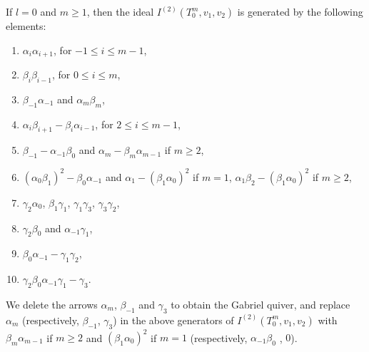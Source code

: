 \documentclass[12pt]{amsart}
\numberwithin{equation}{thm}
\begin{document}
If $l=0$ and $m\ge1$, then the ideal $I^{(2)}(T_{0}^{m},v_{1},v_{2})$ is generated by the following elements:
\begin{enumerate}
\item $\alpha_{i}\alpha_{i+1}$, for $-1\leq i\leq m-1$,
\item $\beta_{i}\beta_{i-1}$, for $0\leq i\leq m$,  
\item $\beta_{-1}\alpha_{-1}$ and $\alpha_m\beta_m$,
\item $\alpha_{i}\beta_{i+1}-\beta_{i}\alpha_{i-1}$, for $2\leq i\leq m-1$, 
\item $\beta_{-1}-\alpha_{-1}\beta_{0}$ and $\alpha_{m}-\beta_{m}\alpha_{m-1}$ if $m\ge2$,
\item $(\alpha_{0}\beta_{1})^{2}-\beta_{0}\alpha_{-1}$ and 
$\alpha_{1}-(\beta_{1}\alpha_{0})^2$ if $m=1$, $\alpha_{1}\beta_{2}-(\beta_{1}\alpha_{0})^{2}$ if $m\ge2$,
\item $\gamma_{2}\alpha_{0}$, $\beta_{1}\gamma_{1}$, $\gamma_{1}\gamma_{3}$, $\gamma_{3}\gamma_{2}$,
\item $\gamma_{2}\beta_{0}$ and $\alpha_{-1}\gamma_{1}$,
\item $\beta_{0}\alpha_{-1}-\gamma_{1}\gamma_{2}$,
\item $\gamma_{2}\beta_{0}\alpha_{-1}\gamma_{1}-\gamma_{3}$.
\end{enumerate}
We delete the arrows $\alpha_{m}$, $\beta_{-1}$ and $\gamma_{3}$ 
to obtain the Gabriel quiver, and replace 
$\alpha_m$ (respectively, $\beta_{-1}$, $\gamma_{3}$) in the above generators of 
$I^{(2)}(T_{0}^{m},v_{1},v_{2})$ with $\beta_{m}\alpha_{m-1}$ if $m\ge2$ and 
$(\beta_1\alpha_0)^2$ if $m=1$ (respectively, $\alpha_{-1}\beta_{0}$ , $0$). 
\end{document}
